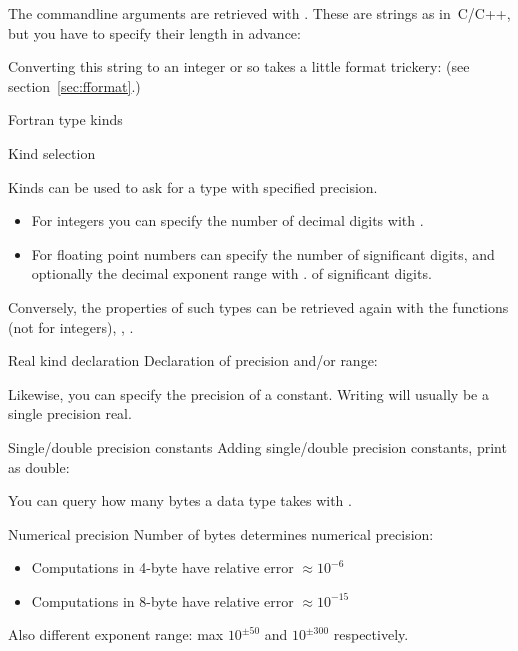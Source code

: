 The commandline arguments are retrieved with
.
These are strings as in~C/C++,
but you have to specify their length in advance:

Converting this string to an integer or so takes a little format trickery:
(see section~\ref{sec:fformat}.)

 {Fortran type kinds}

 {Kind selection}

Kinds can be used to ask for a type with specified precision.
\begin{itemize}
\item For integers you can specify the number of decimal digits with
  .
\item For floating point numbers can specify the number of
  significant digits, and optionally the decimal exponent range with
  .
  of significant digits.
\end{itemize}

Conversely, the properties of such types can be retrieved again
with the functions  (not for integers),
, .

\begin{block}{Real kind declaration}
  Declaration of precision and/or range:
\end{block}

Likewise, you can specify the precision of a constant.
Writing  will usually be a single precision
real. 

\begin{block}{Single/double precision constants}
  \label{sl:fsingledouble}
  Adding single/double precision constants, print as double:
\end{block}

You can query how many bytes a data type takes with
.

\begin{block}{Numerical precision}
  \label{sl:fprecision48}
  Number of bytes determines numerical precision:
  \begin{itemize}
  \item Computations in 4-byte have relative error $\approx 10^{-6}$
  \item Computations in 8-byte have relative error $\approx 10^{-15}$
  \end{itemize}
  Also different exponent range: max $10^{\pm 50}$ and $10^{\pm 300}$ respectively.
\end{block}

